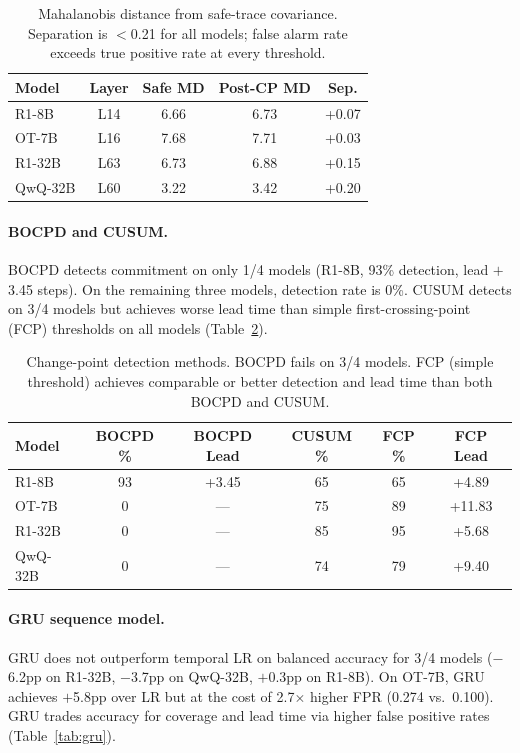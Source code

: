 \documentclass[11pt]{article}
\begin{document}
\begin{table}[t]
\centering
\small
\begin{tabular}{lcccc}
\toprule
\textbf{Model} & \textbf{Layer} & \textbf{Safe MD} & \textbf{Post-CP MD} & \textbf{Sep.} \\
\midrule
R1-8B & L14 & 6.66 & 6.73 & +0.07 \\
OT-7B & L16 & 7.68 & 7.71 & +0.03 \\
R1-32B & L63 & 6.73 & 6.88 & +0.15 \\
QwQ-32B & L60 & 3.22 & 3.42 & +0.20 \\
\bottomrule
\end{tabular}
\caption{Mahalanobis distance from safe-trace covariance. Separation is $<$0.21 for all models; false alarm rate exceeds true positive rate at every threshold.}
\label{tab:mahal}
\end{table}

\paragraph{BOCPD and CUSUM.}
BOCPD detects commitment on only 1/4 models (R1-8B, 93\% detection, lead $+$3.45 steps). On the remaining three models, detection rate is 0\%. CUSUM detects on 3/4 models but achieves worse lead time than simple first-crossing-point (FCP) thresholds on all models (Table~\ref{tab:cpd}).

\begin{table}[t]
\centering
\small
\begin{tabular}{lccccc}
\toprule
\textbf{Model} & \textbf{BOCPD \%} & \textbf{BOCPD Lead} & \textbf{CUSUM \%} & \textbf{FCP \%} & \textbf{FCP Lead} \\
\midrule
R1-8B & 93 & +3.45 & 65 & 65 & +4.89 \\
OT-7B & 0 & --- & 75 & 89 & +11.83 \\
R1-32B & 0 & --- & 85 & 95 & +5.68 \\
QwQ-32B & 0 & --- & 74 & 79 & +9.40 \\
\bottomrule
\end{tabular}
\caption{Change-point detection methods. BOCPD fails on 3/4 models. FCP (simple threshold) achieves comparable or better detection and lead time than both BOCPD and CUSUM.}
\label{tab:cpd}
\end{table}

\paragraph{GRU sequence model.}
GRU does not outperform temporal LR on balanced accuracy for 3/4 models ($-$6.2pp on R1-32B, $-$3.7pp on QwQ-32B, $+$0.3pp on R1-8B). On OT-7B, GRU achieves $+$5.8pp over LR but at the cost of 2.7$\times$ higher FPR (0.274 vs.\ 0.100). GRU trades accuracy for coverage and lead time via higher false positive rates (Table~\ref{tab:gru}).
\end{document}

